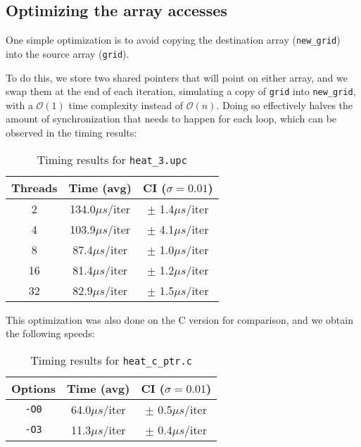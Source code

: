 \documentclass[12pt]{article}
\newcommand{\us}[0]{${\mu}s$}
\begin{document}
\newpage

\subsection{Optimizing the array accesses}
\label{sec:ptrswap}

One simple optimization is to avoid copying the destination array (\texttt{new\_grid}) into the source array (\texttt{grid}).

To do this, we store two shared pointers that will point on either array, and we swap them at the end of each iteration, simulating a copy of \texttt{grid} into \texttt{new\_grid}, with a $\mathcal{O}(1)$ time complexity instead of $\mathcal{O}(n)$.
Doing so effectively halves the amount of synchronization that needs to happen for each loop, which can be observed in the timing results:

\begin{table}[ht]
  \centering\begin{tabular}{|c|c|c|}
    \hline
    Threads & Time (avg) & CI ($\sigma=0.01$) \\
    \hline
    2 & 134.0\us/iter & $\pm$ 1.4\us/iter \\
    4 & 103.9\us/iter & $\pm$ 4.1\us/iter \\
    8 & 87.4\us/iter & $\pm$ 1.0\us/iter \\
    16 & 81.4\us/iter & $\pm$ 1.2\us/iter \\
    32 & 82.9\us/iter & $\pm$ 1.5\us/iter \\
    \hline
  \end{tabular}
  \caption{Timing results for \texttt{heat\_3.upc}}
  \label{tab:heat3}
\end{table}

This optimization was also done on the C version for comparison, and we obtain the following speeds:

\begin{table}[h]
  \centering\begin{tabular}{|c|c|c|}
    \hline
    Options & Time (avg) & CI ($\sigma=0.01$) \\
    \hline
    \texttt{-O0} & 64.0\us/iter & $\pm$ 0.5\us/iter \\
    \texttt{-O3} & 11.3\us/iter & $\pm$ 0.4\us/iter \\
    \hline
  \end{tabular}
  \caption{Timing results for \texttt{heat\_c\_ptr.c}}
  \label{tab:heatcptr}
\end{table}
\end{document}
